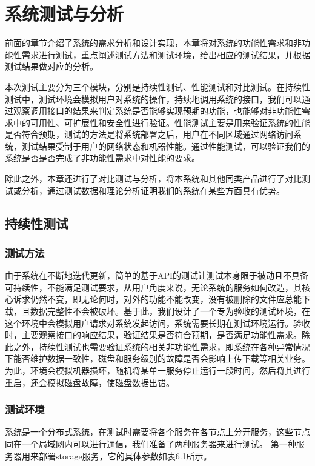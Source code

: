 
\chapter{系统测试与分析}
前面的章节介绍了系统的需求分析和设计实现，本章将对系统的功能性需求和非功能性需求进行测试，重点阐述测试方法和测试环境，给出相应的测试结果，并根据测试结果做对应的分析。

本次测试主要分为三个模块，分别是持续性测试、性能测试和对比测试。在持续性测试中，测试环境会模拟用户对系统的操作，持续地调用系统的接口，我们可以通过观察调用接口的结果来判定系统是否能够实现预期的功能，也能够对非功能性需求中的可用性、可扩展性和安全性进行验证。性能测试主要是用来验证系统的性能是否符合预期，测试的方法是将系统部署之后，用户在不同区域通过网络访问系统，测试结果受制于用户的网络状态和机器性能。通过性能测试，可以验证我们的系统是否是否完成了非功能性需求中对性能的要求。

除此之外，本章还进行了对比测试与分析，将本系统和其他同类产品进行了对比测试或分析，通过测试数据和理论分析证明我们的系统在某些方面具有优势。

\section{持续性测试}%
\subsection{测试方法}%
由于系统在不断地迭代更新，简单的基于API的测试让测试本身限于被动且不具备可持续性，不能满足测试要求，从用户角度来说，无论系统的服务如何改造，其核心诉求仍然不变，即无论何时，对外的功能不能改变，没有被删除的文件应总能下载，且数据完整性不会被破坏。基于此，我们设计了一个专为验收的测试环境，在这个环境中会模拟用户请求对系统发起访问，系统需要长期在测试环境运行。验收时，主要观察接口的响应结果，验证结果是否符合预期，是否满足功能性需求。除此之外，持续性测试也需要验证系统的相关非功能性需求，即系统在各种异常情况下能否维护数据一致性，磁盘和服务级别的故障是否会影响上传下载等相关业务。为此，环境会模拟机器损坏，随机将某单一服务停止运行一段时间，然后将其进行重启，还会模拟磁盘故障，使磁盘数据出错。
\subsection{测试环境}%
系统是一个分布式系统，在测试时需要将各个服务在各节点上分开服务，这些节点同在一个局域网内可以进行通信，我们准备了两种服务器来进行测试。
第一种服务器用来部署storage服务，它的具体参数如表6.1所示。

